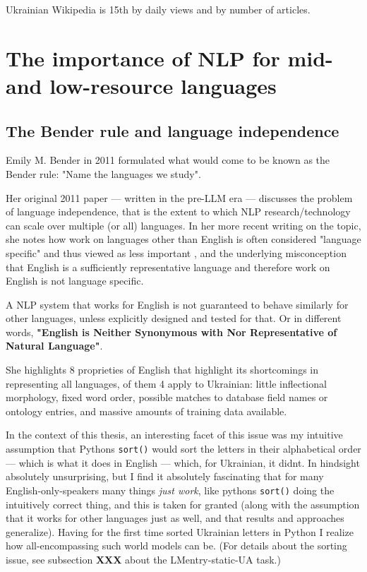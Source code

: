 Ukrainian Wikipedia is 15th by daily views and by number of
articles\cite{wiki:xxx}.

\section{The importance of NLP for mid- and low-resource
languages}\label{the-importance-of-nlp-for-mid--and-low-resource-languages}

\subsection{The Bender rule and language
independence}\label{the-bender-rule-and-language-independence}

Emily M. Bender in 2011\cite{bender} formulated what would come to be
known as the Bender rule\cite{benderpost}: "Name the languages we
study".

Her original 2011 paper --- written in the pre-LLM era --- discusses the
problem of language independence, that is the extent to which NLP
research/technology can scale over multiple (or
\textquotesingle all\textquotesingle) languages. In her more recent
writing on the topic, she notes how work on languages other than English
is often considered "language specific" and thus viewed as less
important \cite{benderpost}, and the underlying misconception that
English is a sufficiently representative language and therefore work on
English is not language specific.

A NLP system that works for English is not guaranteed to behave
similarly for other languages, unless explicitly designed and tested for
that. Or in different words, \textbf{"English is Neither Synonymous with
Nor Representative of Natural Language"}. \cite{benderpost}

She highlights 8 proprieties of English that highlight
it\textquotesingle s shortcomings in representing all languages, of them
4 apply to Ukrainian: little inflectional morphology, fixed word order,
possible matches to database field names or ontology entries, and
massive amounts of training data available.

In the context of this thesis, an interesting facet of this issue was my
intuitive assumption that Python\textquotesingle s \texttt{sort()} would
sort the letters in their alphabetical order --- which is what it does
in English --- which, for Ukrainian, it didn\textquotesingle t. In
hindsight absolutely unsurprising, but I find it absolutely fascinating
that for many English-only-speakers many things \emph{just work}, like
python\textquotesingle s \texttt{sort()} doing the intuitively correct
thing, and this is taken for granted (along with the assumption that it
works for other languages just as well, and that results and approaches
generalize). Having for the first time sorted Ukrainian letters in
Python I realize how all-encompassing such world models can be. (For
details about the sorting issue, see subsection \textbf{XXX} about the
LMentry-static-UA task.)

